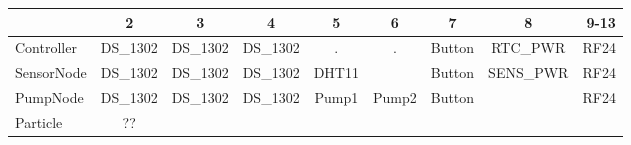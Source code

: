 \begin{table}[htbp]
        \small
        \setlength\tabcolsep{2pt}
\begin{tabular}{ l|c|c|c|c|c|c|c|r }
    & 2 & 3 & 4 & 5 & 6 & 7 & 8 & 9-13 \\ \hline
  Controller & DS\_1302 & DS\_1302 & DS\_1302 & . & . & Button  & RTC\_PWR &  RF24   \\ \hline
  SensorNode & DS\_1302 & DS\_1302 & DS\_1302 &  DHT11  &         & Button  &SENS\_PWR &  RF24  \\ \hline
  PumpNode & DS\_1302 & DS\_1302 & DS\_1302 &  Pump1  &  Pump2  & Button  &         &  RF24   \\ \hline
  Particle & ??\\ \hline
\end{tabular}\\
\end{table}

